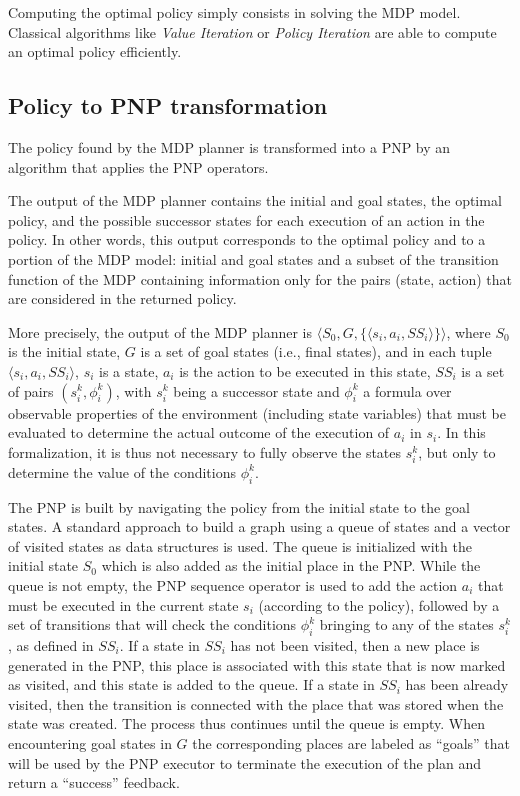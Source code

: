 Computing the optimal policy simply consists in solving the MDP model. Classical algorithms like \emph{Value Iteration} \cite{Bellman57} or \emph{Policy Iteration} \cite{howard1960dynamic} are able to compute an optimal policy efficiently.



\subsection{Policy to PNP transformation}

The policy found by the MDP planner is transformed into a PNP by an algorithm that applies the PNP operators. 

The output of the MDP planner contains the initial and goal states,  the optimal policy, and the possible successor states for each execution of an action in the policy. In other words, this output corresponds to the optimal policy and to a portion of the MDP model: initial and goal states and a subset of the transition function of the MDP containing information only for the pairs (state, action) that are considered in the returned policy.

More precisely, the output of the MDP planner is $\langle S_0, G, \{ \langle s_i, a_i, SS_i \rangle \} \rangle $,  
where $S_0$ is the initial state, $G$ is a set of goal states (i.e., final states),
and in each tuple $\langle s_i, a_i, SS_i \rangle$, $s_i$ is a state, $a_i$ is the action to be executed in this state, $SS_i$ is a set of pairs $(s_i^k, \phi_i^k)$, with $s_i^k$ being a successor state and $\phi_i^k$ a formula over observable properties of the environment (including state variables) that  must be evaluated to determine the actual outcome of the execution of $a_i$ in $s_i$.
In this formalization, it is thus not necessary to fully observe the states $s_i^k$, but only to determine the value of the conditions $\phi_i^k$.

The PNP is built by navigating the policy from the initial state to the goal states.
A standard approach to build a graph using a queue of states and a vector of visited states as data structures is used.
The queue is initialized with the initial state $S_0$ which is also added as the initial place in the PNP.
While the queue is not empty, the PNP sequence operator is used to add the action $a_i$ that must be executed in the current state $s_i$ (according to the policy), followed by a set of transitions that will check the conditions $\phi_i^k$ bringing to any of the states $s_i^k$, as defined in $SS_i$. 
If a state in $SS_i$ has not been visited, then a new place is generated in the PNP, this place is associated with this state that is now marked as visited, and this state is added to the queue. If a state in $SS_i$ has been already visited, then the transition is connected with the place that was stored when the state was created. The process thus continues until the queue is empty.
When encountering goal states in $G$ the corresponding places are labeled as ``goals'' that will be used by the PNP executor to terminate the execution of the plan and return a ``success'' feedback.

